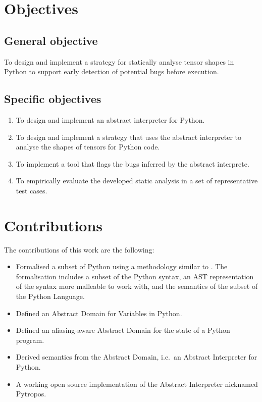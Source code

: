 \section{Objectives}\label{objectives}

\subsection{General objective}\label{general-objective}

To design and implement a strategy for statically analyse tensor shapes
in Python to support early detection of potential bugs before execution.

\subsection{Specific objectives}\label{specific-objectives}

\begin{enumerate}
\def\labelenumi{\arabic{enumi}.}
\tightlist
\item
  To design and implement an abstract interpreter for Python.
\item
  To design and implement a strategy that uses the abstract interpreter
  to analyse the shapes of tensors for Python code.
\item
  To implement a tool that flags the bugs inferred by the abstract
  interprete.
\item
  To empirically evaluate the developed static analysis in a set of
  representative test cases.
\end{enumerate}

\section{Contributions}\label{contributions}

The contributions of this work are the following:

\begin{itemize}
\tightlist
\item
  Formalised a subset of Python using a methodology similar to
  \autocite{fromherz_static_2018}. The formalisation includes a subset
  of the Python syntax, an AST representation of the syntax more
  malleable to work with, and the semantics of the subset of the Python
  Language.
\item
  Defined an Abstract Domain for Variables in Python.
\item
  Defined an aliasing-aware Abstract Domain for the state of a Python
  program.
\item
  Derived semantics from the Abstract Domain, i.e.~an Abstract
  Interpreter for Python.
\item
  A working open source implementation of the Abstract Interpreter
  nicknamed Pytropos.
\end{itemize}

